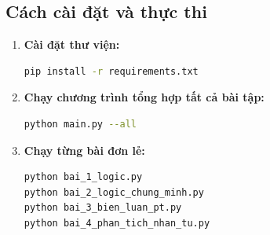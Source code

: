 \documentclass[12pt,a4paper]{article}
\begin{document}
\subsection{Cách cài đặt và thực thi}
\begin{enumerate}
    \item \textbf{Cài đặt thư viện:}
    \begin{lstlisting}[language=bash]
pip install -r requirements.txt
    \end{lstlisting}
    
    \item \textbf{Chạy chương trình tổng hợp tất cả bài tập:}
    \begin{lstlisting}[language=bash]
python main.py --all
    \end{lstlisting}
    
    \item \textbf{Chạy từng bài đơn lẻ:}
    \begin{lstlisting}[language=bash]
python bai_1_logic.py
python bai_2_logic_chung_minh.py
python bai_3_bien_luan_pt.py
python bai_4_phan_tich_nhan_tu.py
    \end{lstlisting}
\end{enumerate}
\end{document}
